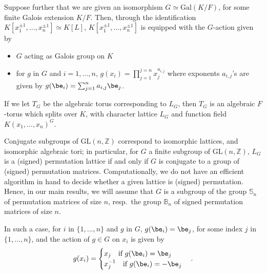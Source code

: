 \documentclass[12pt]{article}
\theoremstyle{plain}
\newcommand{\Z}{\ensuremath{\mathbb{Z}}}
\begin{document}
Suppose further that we are given an isomorphism $G \simeq
\mathrm{Gal}(K/F)$, for some finite Galois extension $K/F$. Then,
through the identification $K[x_1^{\pm 1}, \ldots , x_n^{\pm
    1}]\simeq K[L]$, $K[x_1^{\pm 1}, \ldots , x_n^{\pm 1}]$ is
equipped with the $G$-action given by
\begin{itemize}
\item $G$ acting as Galois group on $K$
\item for $g$ in $G$ and $i=1,\dots,n$, $g(x_i) = \prod_{j=1}^{j=n}
  x_j^{a_{i,j}}$ where exponents $a_{i,j}$'s are given by $g(\be_i) =
  \sum_{j=1}^{n} a_{i,j}\be_j$.
\end{itemize}
If we let $T_G$ be the algebraic torus corresponding to $L_G$, then
$T_G$ is an algebraic $F$-torus which splits over $K$, with character
lattice $L_G$ and function field $K(x_1,\dots,x_n)^G$.


Conjugate subgroups of $\mathrm{GL}(n,\Z)$ correspond to isomorphic
lattices, and isomorphic algebraic tori; in particular, for $G$ a
finite subgroup of $\mathrm{GL}(n,\mathbb{Z})$, $L_G$ is a (signed)
permutation lattice if and only if $G$ is conjugate to a group of
(signed) permutation matrices.  Computationally, we do not have an
efficient algorithm in hand to decide whether a given lattice is
(signed) permutation. Hence, in our main results, we will assume that
$G$ is a subgroup of the group $\mathbb{S}_n$ of permutation matrices
of size $n$, resp.\ the group $\mathbb{B}_n$ of signed permutation
matrices of size $n$. 

In such a case, for $i$ in $\{1,\dots,n\}$ and $g$ in $G$,
$g(\be_i)=\be_j$, for some index $j$ in $\{1,\dots,n\}$, 
and the action of $g \in G$ on $x_i$ is given by $$g(x_i)
= \begin{cases} x_j \quad \text{if~} g(\be_i) = \be_j
  \\ x^{-1}_j \quad \text{if~} g(\be_i) = -\be_j \end{cases} .$$






 

\end{document}
